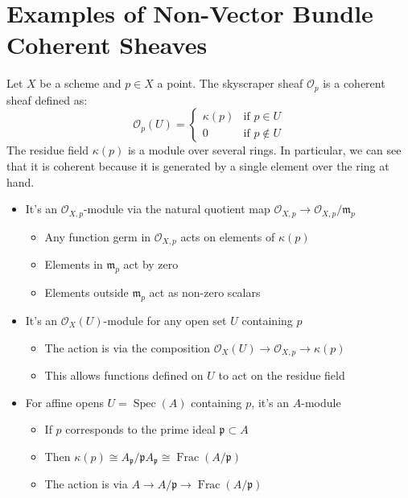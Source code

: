 \documentclass[12pt]{article}
\begin{document}
\section{Examples of Non-Vector Bundle Coherent Sheaves}
\begin{example}
    Let $X$ be a scheme and $p \in X$ a point. The skyscraper sheaf $\mathcal{O}_p$ is a coherent sheaf defined as:
    \[
        \mathcal{O}_p(U) = \begin{cases}
            \kappa(p) & \text{if } p \in U     \\
            0         & \text{if } p \not\in U
        \end{cases}
    \]
    The residue field $\kappa(p)$ is a module over several rings. In particular, we can see that it is coherent because it is generated by a single element over the ring at hand.
    \begin{itemize}
        \item It's an $\mathcal{O}_{X,p}$-module via the natural quotient map $\mathcal{O}_{X,p} \to \mathcal{O}_{X,p}/\mathfrak{m}_p$
              \begin{itemize}
                  \item Any function germ in $\mathcal{O}_{X,p}$ acts on elements of $\kappa(p)$
                  \item Elements in $\mathfrak{m}_p$ act by zero
                  \item Elements outside $\mathfrak{m}_p$ act as non-zero scalars
              \end{itemize}

        \item It's an $\mathcal{O}_X(U)$-module for any open set $U$ containing $p$
              \begin{itemize}
                  \item The action is via the composition $\mathcal{O}_X(U) \to \mathcal{O}_{X,p} \to \kappa(p)$
                  \item This allows functions defined on $U$ to act on the residue field
              \end{itemize}

        \item For affine opens $U = \operatorname{Spec}(A)$ containing $p$, it's an $A$-module
              \begin{itemize}
                  \item If $p$ corresponds to the prime ideal $\mathfrak{p} \subset A$
                  \item Then $\kappa(p) \cong A_{\mathfrak{p}}/\mathfrak{p}A_{\mathfrak{p}} \cong \operatorname{Frac}(A/\mathfrak{p})$
                  \item The action is via $A \to A/\mathfrak{p} \to \operatorname{Frac}(A/\mathfrak{p})$
              \end{itemize}
    \end{itemize}


\end{example}
\end{document}

